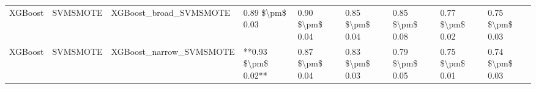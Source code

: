 \begin{tabular}{lllllllll}
                        XGBoost &                      SVMSMOTE &                       XGBoost\_broad\_SVMSMOTE &     0.89 \$\textbackslash pm\$ 0.03 &           0.90 \$\textbackslash pm\$ 0.04 &       0.85 \$\textbackslash pm\$ 0.04 &        0.85 \$\textbackslash pm\$ 0.08 &                         0.77 \$\textbackslash pm\$ 0.02 & 0.75 \$\textbackslash pm\$ 0.03 \\
                        XGBoost &                      SVMSMOTE &                      XGBoost\_narrow\_SVMSMOTE & **0.93 \$\textbackslash pm\$ 0.02** &           0.87 \$\textbackslash pm\$ 0.04 &       0.83 \$\textbackslash pm\$ 0.03 &        0.79 \$\textbackslash pm\$ 0.05 &                         0.75 \$\textbackslash pm\$ 0.01 & 0.74 \$\textbackslash pm\$ 0.03 \\
\bottomrule
\end{tabular}
